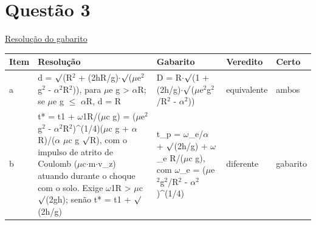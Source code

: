 \documentclass{article}%
\begin{document}
\section*{Questão 3}%
\href{https://poliedroresolve.sistemapoliedro.com.br/vestibulares/ita/2027/ita-2-fase-dia-3-22-10-2026-2-fase-dia-3/dissertativa-3-fisica-2-fase-dia-3-ita-2027}{Resolução do gabarito}\par\smallskip%
\begin{longtable}{@{}p{} p{} p{} p{} p{}@{}}\toprule Item & Resolução & Gabarito & Veredito & Certo \\ \midrule
a & d = $\surd$(R$^2$ + (2hR/g)$\cdot$$\surd$($\mu$e$^2$g$^2$ - $\alpha$$^2$R$^2$)), para $\mu$e g > $\alpha$R; se $\mu$e g $\leq$ $\alpha$R, d = R & D = R$\cdot$$\surd$(1 + (2h/g)$\cdot$$\surd$($\mu$e$^2$g$^2$/R$^2$ - $\alpha$$^2$)) & equivalente & ambos \\
b & t* = t1 + $\omega$1R/($\mu$c g) = ($\mu$e$^2$g$^2$ - $\alpha$$^2$R$^2$)\^{}(1/4)($\mu$c g + $\alpha$R)/($\alpha$ $\mu$c g $\surd$R), com o impulso de atrito de Coulomb ($\mu$c$\cdot$m$\cdot$v\_z) atuando durante o choque com o solo. Exige $\omega$1R > $\mu$c$\surd$(2gh); senão t* = t1 + $\surd$(2h/g) & t\_p = $\omega$\_e/$\alpha$ + $\surd$(2h/g) + $\omega$\_e R/($\mu$c g), com $\omega$\_e = ($\mu$e$^2$g$^2$/R$^2$ - $\alpha$$^2$)\^{}(1/4) & diferente & gabarito \\
\bottomrule\end{longtable}%
\end{document}
